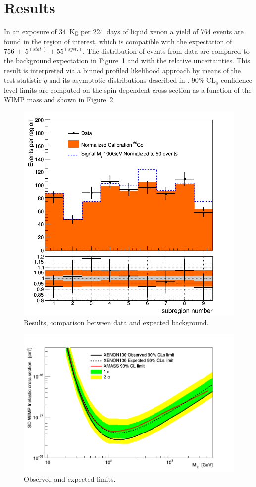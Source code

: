 \section{Results}
In an exposure of 34~Kg per 224~days of liquid xenon a yield of 764 events are found in the region of interest,
which is compatible with the expectation of $756 \, \pm \, 5^{(stat.)} \, \pm 55^{(syst.)}$. The distribution 
of events from data are compared to the background expectation in Figure~\ref{fig:dataVSbkg} and with the relative
uncertainties.  
This result is interpreted via a binned profiled likelihood approach by means of the test statistic $\tilde{q}$
and its asymptotic distributions described in \cite{asympt}. 90\% CL$_s$ \cite{cls} confidence level limits are 
computed on the spin dependent cross section as a function of the WIMP mass and shown in Figure~\ref{fig:limits}.


\begin{figure}[h]
  \includegraphics[width=\linewidth]{images/data_vs_bkg.png}
  \caption{Results, comparison between data and expected background.}
  \label{fig:dataVSbkg}
\end{figure}

\begin{figure}[h!]
  \includegraphics[width=\linewidth]{images/limit_reb.png}
  \caption{Observed and expected limits.}
  \label{fig:limits}
\end{figure}


